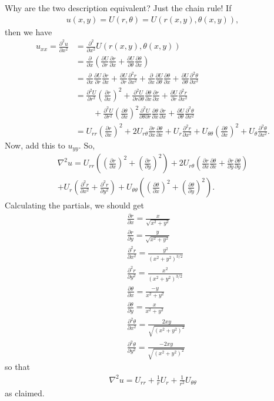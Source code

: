 \documentclass{book}
\theoremstyle{definition}
\newcommand{\p}{\partial}
\newcommand{\f}[2]{\frac{#1}{#2}}
\newcommand{\lp}{\left(}
\newcommand{\rp}{\right)}
\begin{document}
Why are the two description equivalent? Just the chain rule! If
\begin{align*}
u(x,y) = U(r,\theta) = U(r(x,y), \theta(x,y)),
\end{align*}
then we have
\begin{align*}
u_{xx} = \f{\p^2 u}{\p x^2} &= \f{\p^2}{\p x^2}U(r(x,y), \theta(x,y))\\
&= \f{\p}{\p x}\left( \f{\p U}{\p r}\f{\p r}{\p x} +  \f{\p U}{\p \theta}\f{\p \theta}{\p x} \right)\\
&= \f{\p}{\p x}\f{\p U}{\p r}\f{\p r}{\p x} + \f{\p U}{\p r}\f{\p^2 r}{\p x^2} + \f{\p }{\p x}\f{\p U}{\p \theta}\f{\p \theta}{\p x} + \f{\p U}{\p \theta}\f{\p^2 \theta}{\p x^2}\\
&= \f{\p^2 U}{\p r^2}\left(\f{\p r}{\p x}\right)^2 + \f{\p^2 U}{\p r \p \theta}\f{\p \theta}{\p x}\f{\p r}{\p x} + \f{\p U}{\p r}\f{\p^2 r}{\p x^2} \\
&\,\,\,\,\,\,\,\,\,\,\,\,\,+  \f{\p^2 U}{\p r^2}\left(\f{\p \theta}{\p x}\right)^2 \f{\p^2 U}{\p \theta \p r}\f{\p \theta}{\p x}\f{\p r}{\p x} + \f{\p U}{\p \theta}\f{\p^2 \theta}{\p x^2}\\
&= U_{rr}\lp\f{\p r}{\p x}\rp^2 + 2U_{r\theta} \f{\p r}{\p x} \f{\p \theta}{\p x} + U_r \f{\p^2 r}{\p x^2} + U_{\theta\theta} \lp \f{\p \theta}{\p x}\rp^2 + U_\theta \f{\p^2 \theta}{\p x^2}.
\end{align*}
Now, add this to $u_{yy}$. So,
\begin{align*}
\nabla^2 u = U_{rr} \lp \lp \f{\p r}{\p x} \rp^2 + \lp \f{\p r}{\p y} \rp^2 \rp+ 2U_{r\theta} \lp \f{\p r}{\p x}\f{\p \theta}{\p x}  +  
\f{\p r}{\p y}\f{\p \theta}{\p y} \rp \\
+ U_r\lp\f{\p^2 r}{\p x^2} + \f{\p^2 r}{\p y^2} \rp + U_{\theta\theta} \lp \lp \f{\p\theta}{\p x} \rp^2 +  \lp\f{\p\theta}{\p y} \rp^2\rp.
\end{align*}
Calculating the partials, we should get
\begin{align*}
&\f{\p r}{\p x} = \f{x}{\sqrt{x^2 +y^2}}\\
&\f{\p r}{\p y} = \f{y}{\sqrt{x^2 +y^2}}\\
&\f{\p^2 r}{\p x^2} = \f{y^2}{(x^2+y^2)^{3/2}}\\
&\f{\p^2 r}{\p y^2} = \f{x^2}{(x^2+y^2)^{3/2}}\\
&\f{\p \theta}{\p x} = \f{-y}{x^2+y^2}\\
&\f{\p \theta}{\p y} = \f{x}{x^2+y^2}\\
&\f{\p^2 \theta}{\p x^2} = \f{2xy}{\sqrt{(x^2+y^2)^2}}\\
&\f{\p^2 \theta}{\p y^2} = \f{-2xy}{\sqrt{(x^2+y^2)^2}}
\end{align*}
so that
\begin{align*}
\nabla^2 u = U_{rr} + \f{1}{r}U_r + \f{1}{r^2}U_{\theta\theta}
\end{align*}
as claimed. \\
\end{document}
